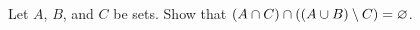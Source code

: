 \documentclass[../notes.tex]{subfiles}
\begin{document}
\begin{homework}
    Let $A$, $B$, and $C$ be sets. Show that $(A\cap C)\cap((A\cup B)\setminus C)=\varnothing$.
\end{homework}

\end{document}
